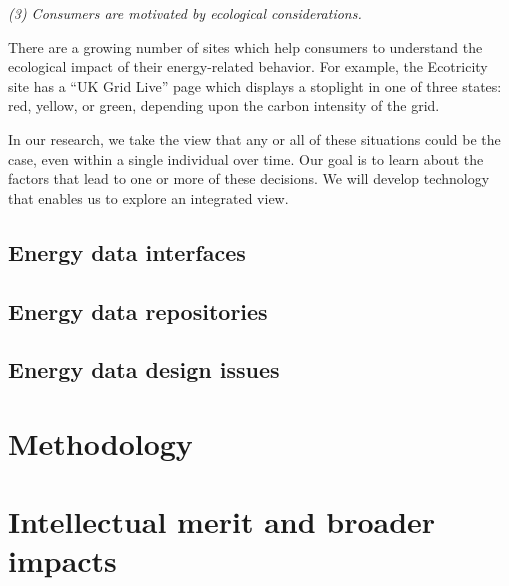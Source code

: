 {\em (3) Consumers are motivated by ecological considerations.}

There are a growing number of sites which help consumers to understand the
ecological impact of their energy-related behavior.  For example, the
Ecotricity site has a ``UK Grid Live'' page which displays a stoplight in
one of three states: red, yellow, or green, depending upon the carbon
intensity of the grid.  

In our research, we take the view that any or all of these situations could
be the case, even within a single individual over time. Our goal is to
learn about the factors that lead to one or more of these decisions. We
will develop technology that enables us to explore an integrated view.


\subsection{Energy data interfaces}

\subsection{Energy data repositories}

\subsection{Energy data design issues}

\section{Methodology}
\label{sec:methodology}

\section{Intellectual merit and broader impacts}
\label{sec:merit}








 










